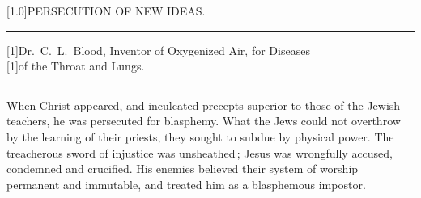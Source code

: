 \documentclass[10pt]{article}
\begin{document}
%
%
\begin{multicols}{3}
	\begin{centering}
		\Large \scalebox{1.2}[1.0]{PERSECUTION OF NEW IDEAS.}

		\vspace{3mm}

		\rule[3pt]{2em}{0.7pt}

		\vspace{2mm}

		\large \scalebox{1.15}[1]{Dr.~C.~L.~Blood, Inventor of Oxygenized Air, for Diseases}\\[2.5mm]
		\scalebox{1.15}[1]{of the Throat and Lungs.}

		\vspace{3mm}

		\rule[3pt]{2em}{0.7pt}

		\vspace{2mm}

	\end{centering}

	\openup 1.09mm
	When Christ appeared, and inculcated precepts superior to those of the\linebreak
	Jewish teachers, he was persecuted for blasphemy. What the Jews could\linebreak
	not overthrow by the learning of their priests, they sought to subdue by\linebreak
	physical power. The treacherous sword of injustice was unsheathed\,;\linebreak
	Jesus was wrongfully accused, condemned and crucified. His enemies\linebreak
	believed their system of worship permanent and immutable, and treated him\linebreak
	as a blasphemous impostor.


\end{multicols}
\end{document}
